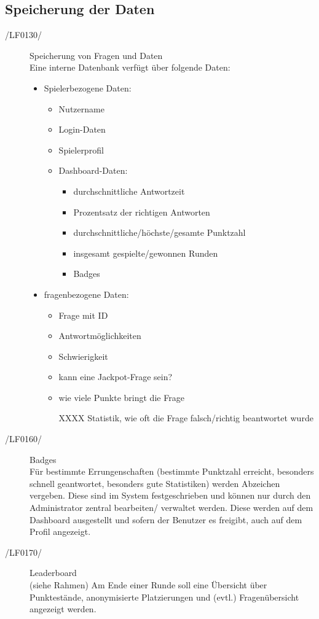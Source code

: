 \documentclass[11pt,a4paper]{scrreprt}
\begin{document}
\subsection{Speicherung der Daten}
\begin{description}
\item[/LF0130/] Speicherung von Fragen und Daten \\
Eine interne Datenbank verfügt über folgende Daten:
	\begin{itemize}
	\item Spielerbezogene Daten:
		\begin{itemize}
		\item Nutzername
		\item Login-Daten
		\item Spielerprofil
		\item Dashboard-Daten:
			\begin{itemize}
			\item durchschnittliche Antwortzeit
			\item Prozentsatz der richtigen Antworten
			\item durchschnittliche/höchste/gesamte Punktzahl
			\item insgesamt gespielte/gewonnen Runden
			\item Badges
			\end{itemize}
		\end{itemize}
	\item fragenbezogene Daten:
		\begin{itemize}
		\item Frage mit ID
		\item Antwortmöglichkeiten
		\item Schwierigkeit
		\item kann eine Jackpot-Frage sein?
		\item wie viele Punkte bringt die Frage
		\item[XXXX] Statistik, wie oft die Frage falsch/richtig beantwortet wurde
		\end{itemize}
	\end{itemize}
\end{description}

\begin{description}
\item[/LF0160/] Badges \\
Für bestimmte Errungenschaften (bestimmte Punktzahl erreicht, besonders schnell geantwortet, besonders gute Statistiken) werden Abzeichen vergeben. Diese sind im System festgeschrieben und können nur durch den Administrator zentral bearbeiten/ verwaltet werden. Diese werden auf dem Dashboard ausgestellt und sofern der Benutzer es freigibt, auch auf dem Profil angezeigt.
\item[/LF0170/] Leaderboard \\
(siehe Rahmen) Am Ende einer Runde soll eine Übersicht über Punktestände, anonymisierte Platzierungen und (evtl.) Fragenübersicht angezeigt werden.
\end{description}
\end{document}
